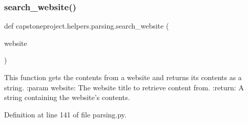 \subsubsection{\texorpdfstring{search\+\_\+website()}{search\_website()}}
{\footnotesize\ttfamily def capstoneproject.\+helpers.\+parsing.\+search\+\_\+website (\begin{DoxyParamCaption}\item[{}]{website }\end{DoxyParamCaption})}

\begin{DoxyVerb}This function gets the contents from a website and returns its contents as a string.
:param website: The website title to retrieve content from.
:return: A string containing the website's contents.
\end{DoxyVerb}
 

Definition at line 141 of file parsing.\+py.

